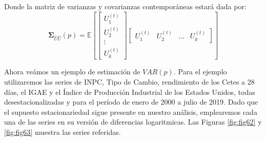 \documentclass[
]{book}
\begin{document}
Donde la matriz de varianzas y covarianzas contemporáneas estará dada por:
\begin{equation*}
            \mathbf{\Sigma}_{\hat{U}\hat{U}}(p) = \mathbb{E} \left[
            \begin{bmatrix}
            U^{(t)}_{1} \\ U^{(t)}_{2} \\ \vdots \\ U^{(t)}_{k}
            \end{bmatrix}
            \begin{bmatrix}
            U^{(t)}_{1} & U^{(t)}_{2} & \ldots & U^{(t)}_{k}
            \end{bmatrix}
            \right]
        \end{equation*}

Ahora veámos un ejemplo de estimación de \(VAR(p)\). Para el ejemplo utilizaremos las series de INPC, Tipo de Cambio, rendimiento de los Cetes a 28 días, el IGAE y el Índice de Producción Industrial de los Estados Unidos, todas desestacionalizadas y para el período de enero de 2000 a julio de 2019. Dado que el supuesto estacionariedad sigue presente en nuestro análisis, emplearemos cada una de las series en su versión de diferencias logaritmicas. Las Figuras \ref{fig:fig62} y \ref{fig:fig63} muestra las series referidas.
\end{document}
